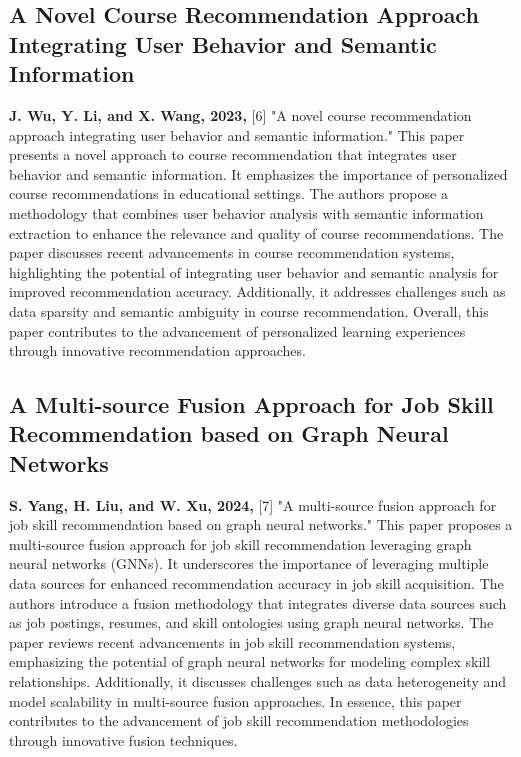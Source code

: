 \subsection{A Novel Course Recommendation Approach Integrating User Behavior and Semantic Information}

\textbf{J. Wu, Y. Li, and X. Wang, 2023,} [6] "A novel course recommendation approach integrating user behavior and semantic information." This paper presents a novel approach to course recommendation that integrates user behavior and semantic information. It emphasizes the importance of personalized course recommendations in educational settings. The authors propose a methodology that combines user behavior analysis with semantic information extraction to enhance the relevance and quality of course recommendations. The paper discusses recent advancements in course recommendation systems, highlighting the potential of integrating user behavior and semantic analysis for improved recommendation accuracy. Additionally, it addresses challenges such as data sparsity and semantic ambiguity in course recommendation. Overall, this paper contributes to the advancement of personalized learning experiences through innovative recommendation approaches.

\subsection{A Multi-source Fusion Approach for Job Skill Recommendation based on Graph Neural Networks}

\textbf{S. Yang, H. Liu, and W. Xu, 2024,} [7] "A multi-source fusion approach for job skill recommendation based on graph neural networks." This paper proposes a multi-source fusion approach for job skill recommendation leveraging graph neural networks (GNNs). It underscores the importance of leveraging multiple data sources for enhanced recommendation accuracy in job skill acquisition. The authors introduce a fusion methodology that integrates diverse data sources such as job postings, resumes, and skill ontologies using graph neural networks. The paper reviews recent advancements in job skill recommendation systems, emphasizing the potential of graph neural networks for modeling complex skill relationships. Additionally, it discusses challenges such as data heterogeneity and model scalability in multi-source fusion approaches. In essence, this paper contributes to the advancement of job skill recommendation methodologies through innovative fusion techniques.


